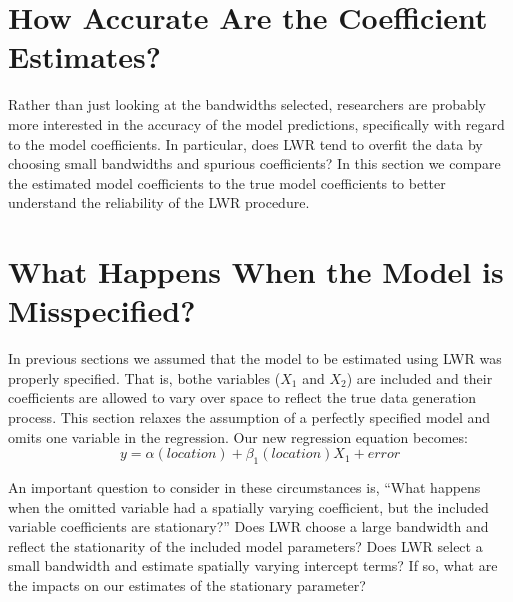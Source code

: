 \documentclass{article}
\begin{document}
\section{How Accurate Are the Coefficient Estimates?}

Rather than just looking at the bandwidths selected, researchers are probably more interested in the accuracy of the model predictions, specifically with regard to the model coefficients. In particular, does LWR tend to overfit the data by choosing small bandwidths and spurious coefficients? In this section we compare the estimated model coefficients to the true model coefficients to better understand the reliability of the LWR procedure.


\section{What Happens When the Model is Misspecified?}

In previous sections we assumed that the model to be estimated using LWR was properly specified. That is, bothe variables ($X_1$ and $X_2$) are included and their coefficients are allowed to vary over space to reflect the true data generation process. This section relaxes the assumption of a perfectly specified model and omits one variable in the regression. Our new regression equation becomes:
\begin{equation}
y = \alpha (location) + \beta _1 (location) X_1 + error
\end{equation}

An important question to consider in these circumstances is, ``What happens when the omitted variable had a spatially varying coefficient, but the included variable coefficients are stationary?'' Does LWR choose a large bandwidth and reflect the stationarity of the included model parameters? Does LWR select a small bandwidth and estimate spatially varying intercept terms? If so, what are the impacts on our estimates of the stationary parameter?
\end{document}
